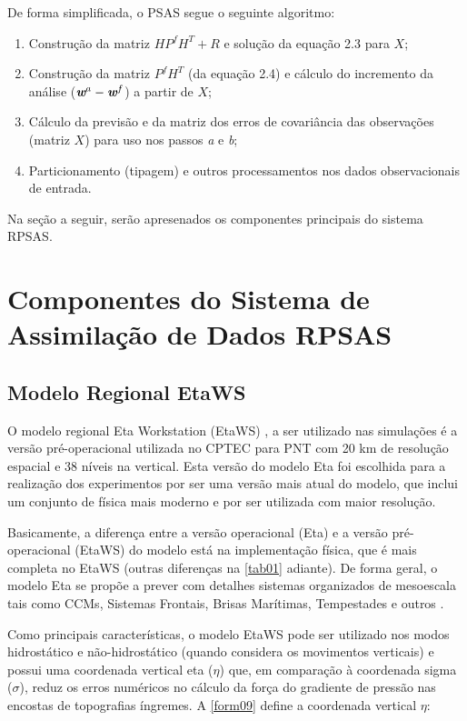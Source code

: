 De forma simplificada, o PSAS segue o seguinte algoritmo:

\begin{enumerate}
\item Construção da matriz $HP^{f}H^{T}+R$ e solução da equação 2.3 para $X$;
\item Construção da matriz $P^{f}H^{T}$ (da equação 2.4) e cálculo do incremento da análise ($\textit{\textbf{w}}^a-\textit{\textbf{w}}^f$) a partir de $X$;
\item Cálculo da previsão e da matriz dos erros de covariância das observações (matriz $X$) para uso nos passos \textit{a} e \textit{b};
\item Particionamento (tipagem) e outros processamentos nos dados observacionais de entrada.
\end{enumerate}

Na seção a seguir, serão apresenados os componentes principais do sistema RPSAS.

\section{Componentes do Sistema de Assimilação de Dados RPSAS}
\label{ss:compsisassimdados}

\subsection{Modelo Regional EtaWS}

O modelo regional Eta Workstation (EtaWS) \cite{mesingeretal88}, \cite{black94} a ser utilizado nas simulações é a versão pré-operacional utilizada no CPTEC para PNT com 20 km de resolução espacial e 38 níveis na vertical. Esta versão do modelo Eta foi escolhida para a realização dos experimentos por ser uma versão mais atual do modelo, que inclui um conjunto de física mais moderno e por ser utilizada com maior resolução. 

Basicamente, a diferença entre a versão operacional (Eta) e a versão pré-operacional (EtaWS) do modelo está na implementação física, que é mais completa no EtaWS (outras diferenças na \autoref{tab01} adiante). De forma geral, o modelo Eta se propõe a prever com detalhes sistemas organizados de mesoescala tais como CCMs, Sistemas Frontais, Brisas Marítimas, Tempestades e outros \cite{chou96}.

Como principais características, o modelo EtaWS pode ser utilizado nos modos hidrostático e não-hidrostático (quando considera os movimentos verticais) e possui uma coordenada vertical eta ($\eta$) que, em comparação à coordenada sigma ($\sigma$), reduz os erros numéricos no cálculo da força do gradiente de pressão nas encostas de topografias íngremes. A \autoref{form09} define a coordenada vertical $\eta$:

